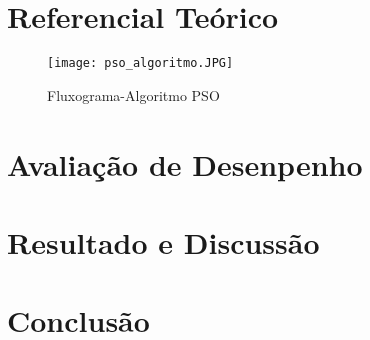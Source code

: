 \documentclass[conference]{IEEEtran}
\begin{document}
\section{Referencial Teórico}
	
	\begin{figure}[htbp]
	\centerline{\texttt{[image: pso\_algoritmo.JPG]}}
	\caption{Fluxograma-Algoritmo PSO}
	\label{fig}
	\end{figure}
	
	
\section{Avaliação de Desenpenho}
  
\section{Resultado e Discussão}

   
    
\section*{Conclusão}

  

\begin{thebibliography}{00}


\end{thebibliography}
\end{document}
